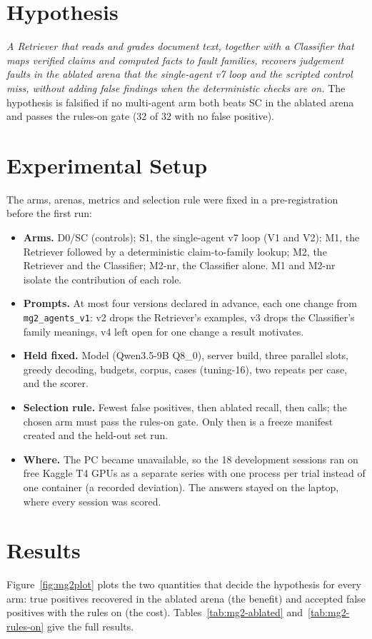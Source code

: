 \section{Hypothesis}
\emph{A Retriever that reads and grades document text, together with a Classifier that maps verified
claims and computed facts to fault families, recovers judgement faults in the ablated arena that the
single-agent v7 loop and the scripted control miss, without adding false findings when the
deterministic checks are on.} The hypothesis is falsified if no multi-agent arm both beats SC in the
ablated arena and passes the rules-on gate (32 of 32 with no false positive).

\section{Experimental Setup}
The arms, arenas, metrics and selection rule were fixed in a pre-registration before the first run:
\begin{itemize}[itemsep=1pt]
\item \textbf{Arms.} D0/SC (controls); S1, the single-agent v7 loop (V1 and V2); M1, the Retriever
followed by a deterministic claim-to-family lookup; M2, the Retriever and the Classifier; M2-nr,
the Classifier alone. M1 and M2-nr isolate the contribution of each role.
\item \textbf{Prompts.} At most four versions declared in advance, each one change from
\texttt{mg2\_agents\_v1}: v2 drops the Retriever's examples, v3 drops the Classifier's family
meanings, v4 left open for one change a result motivates.
\item \textbf{Held fixed.} Model (Qwen3.5-9B Q8\_0), server build, three parallel slots, greedy
decoding, budgets, corpus, cases (tuning-16), two repeats per case, and the scorer.
\item \textbf{Selection rule.} Fewest false positives, then ablated recall, then calls; the chosen
arm must pass the rules-on gate. Only then is a freeze manifest created and the held-out set run.
\item \textbf{Where.} The PC became unavailable, so the 18 development sessions ran on free Kaggle T4
GPUs as a separate series with one process per trial instead of one container (a recorded
deviation). The answers stayed on the laptop, where every session was scored.
\end{itemize}

\section{Results}
Figure~\ref{fig:mg2plot} plots the two quantities that decide the hypothesis for every arm: true positives
recovered in the ablated arena (the benefit) and accepted false positives with the rules on (the
cost). Tables~\ref{tab:mg2-ablated} and~\ref{tab:mg2-rules-on} give the full results.

